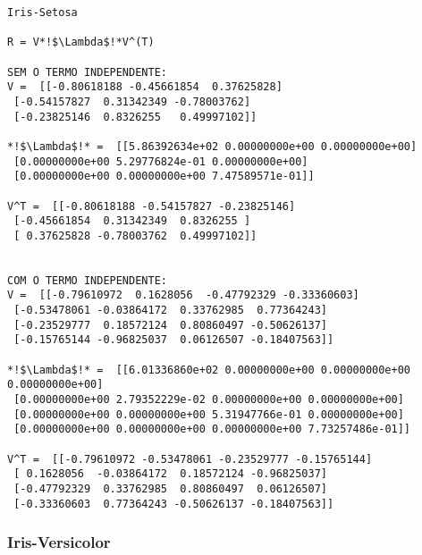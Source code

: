 \documentclass[a4paper,12pt,twoside]{article}
\begin{document}
\begin{lstlisting}
Iris-Setosa

R = V*!$\Lambda$!*V^(T)

SEM O TERMO INDEPENDENTE: 
V =  [[-0.80618188 -0.45661854  0.37625828]
 [-0.54157827  0.31342349 -0.78003762]
 [-0.23825146  0.8326255   0.49997102]]

*!$\Lambda$!* =  [[5.86392634e+02 0.00000000e+00 0.00000000e+00]
 [0.00000000e+00 5.29776824e-01 0.00000000e+00]
 [0.00000000e+00 0.00000000e+00 7.47589571e-01]]

V^T =  [[-0.80618188 -0.54157827 -0.23825146]
 [-0.45661854  0.31342349  0.8326255 ]
 [ 0.37625828 -0.78003762  0.49997102]]


COM O TERMO INDEPENDENTE: 
V =  [[-0.79610972  0.1628056  -0.47792329 -0.33360603]
 [-0.53478061 -0.03864172  0.33762985  0.77364243]
 [-0.23529777  0.18572124  0.80860497 -0.50626137]
 [-0.15765144 -0.96825037  0.06126507 -0.18407563]]

*!$\Lambda$!* =  [[6.01336860e+02 0.00000000e+00 0.00000000e+00 0.00000000e+00]
 [0.00000000e+00 2.79352229e-02 0.00000000e+00 0.00000000e+00]
 [0.00000000e+00 0.00000000e+00 5.31947766e-01 0.00000000e+00]
 [0.00000000e+00 0.00000000e+00 0.00000000e+00 7.73257486e-01]]

V^T =  [[-0.79610972 -0.53478061 -0.23529777 -0.15765144]
 [ 0.1628056  -0.03864172  0.18572124 -0.96825037]
 [-0.47792329  0.33762985  0.80860497  0.06126507]
 [-0.33360603  0.77364243 -0.50626137 -0.18407563]]

\end{lstlisting}

\subsubsection{Iris-Versicolor}
\end{document}
